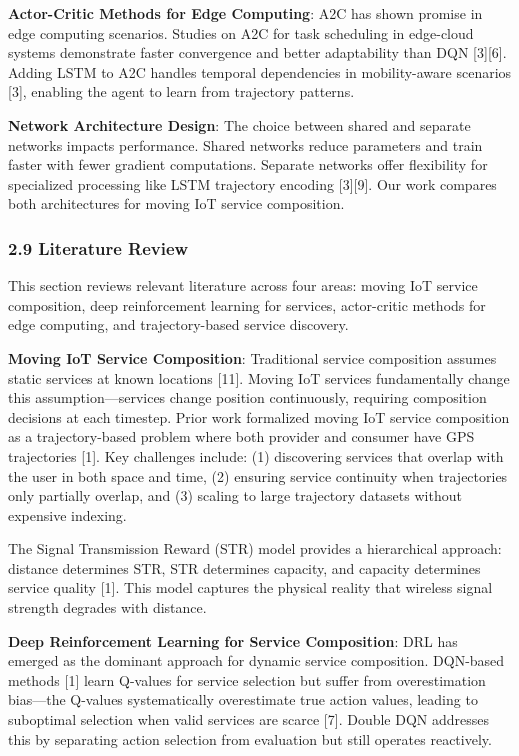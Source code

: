 \documentclass[
  10pt,
  twocolumn,
]{article}
\begin{document}
\textbf{Actor-Critic Methods for Edge Computing}: A2C has shown promise
in edge computing scenarios. Studies on A2C for task scheduling in
edge-cloud systems demonstrate faster convergence and better
adaptability than DQN {[}3{]}{[}6{]}. Adding LSTM to A2C handles
temporal dependencies in mobility-aware scenarios {[}3{]}, enabling the
agent to learn from trajectory patterns.

\textbf{Network Architecture Design}: The choice between shared and
separate networks impacts performance. Shared networks reduce parameters
and train faster with fewer gradient computations. Separate networks
offer flexibility for specialized processing like LSTM trajectory
encoding {[}3{]}{[}9{]}. Our work compares both architectures for moving
IoT service composition.

\hypertarget{literature-review}{%
	\subsubsection{2.9 Literature Review}\label{literature-review}}

This section reviews relevant literature across four areas: moving IoT
service composition, deep reinforcement learning for services,
actor-critic methods for edge computing, and trajectory-based service
discovery.

\textbf{Moving IoT Service Composition}: Traditional service composition
assumes static services at known locations {[}11{]}. Moving IoT services
fundamentally change this assumption---services change position
continuously, requiring composition decisions at each timestep. Prior
work formalized moving IoT service composition as a trajectory-based
problem where both provider and consumer have GPS trajectories {[}1{]}.
Key challenges include: (1) discovering services that overlap with the
user in both space and time, (2) ensuring service continuity when
trajectories only partially overlap, and (3) scaling to large trajectory
datasets without expensive indexing.

The Signal Transmission Reward (STR) model provides a hierarchical
approach: distance determines STR, STR determines capacity, and capacity
determines service quality {[}1{]}. This model captures the physical
reality that wireless signal strength degrades with distance.

\textbf{Deep Reinforcement Learning for Service Composition}: DRL has
emerged as the dominant approach for dynamic service composition.
DQN-based methods {[}1{]} learn Q-values for service selection but
suffer from overestimation bias---the Q-values systematically
overestimate true action values, leading to suboptimal selection when
valid services are scarce {[}7{]}. Double DQN addresses this by
separating action selection from evaluation but still operates
reactively.
\end{document}
